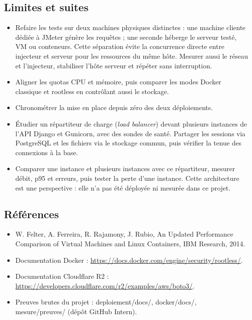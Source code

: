 \documentclass[a4paper,11pt]{article}
\begin{document}
\subsection{Limites et suites}
\begin{itemize}
\item Refaire les tests sur deux machines physiques distinctes : une machine cliente dédiée à JMeter génère les requêtes ; une seconde héberge le serveur testé, VM ou conteneurs. Cette séparation évite la concurrence directe entre injecteur et serveur pour les ressources du même hôte. Mesurer aussi le réseau et l'injecteur, stabiliser l'hôte serveur et répéter sans interruption.
\item Aligner les quotas CPU et mémoire, puis comparer les modes Docker classique et rootless en contrôlant aussi le stockage.
\item Chronométrer la mise en place depuis zéro des deux déploiements.
\item Étudier un répartiteur de charge (\textit{load balancer}) devant plusieurs instances de l'API Django et Gunicorn, avec des sondes de santé. Partager les sessions via PostgreSQL et les fichiers via le stockage commun, puis vérifier la tenue des connexions à la base.
\item Comparer une instance et plusieurs instances avec ce répartiteur, mesurer débit, p95 et erreurs, puis tester la perte d'une instance. Cette architecture est une perspective : elle n'a pas été déployée ni mesurée dans ce projet.
\end{itemize}
\subsection*{Références}
\begin{itemize}
\item W. Felter, A. Ferreira, R. Rajamony, J. Rubio, An Updated Performance Comparison of Virtual Machines and Linux Containers, IBM Research, 2014.
\item Documentation Docker : \url{https://docs.docker.com/engine/security/rootless/}.
\item Documentation Cloudflare R2 : \url{https://developers.cloudflare.com/r2/examples/aws/boto3/}.
\item Preuves brutes du projet : deploiement/docs/, docker/docs/, mesure/preuves/ (dépôt GitHub Intern).
\end{itemize}
\end{document}
